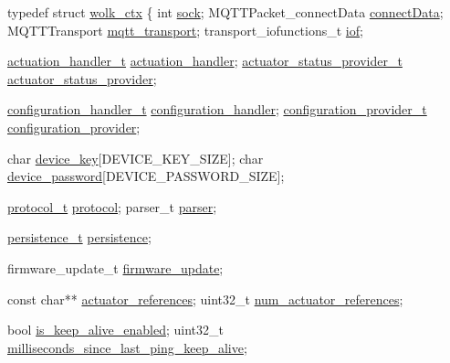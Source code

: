 \begin{DoxyCodeInclude}
\textcolor{keyword}{typedef} \textcolor{keyword}{struct }\hyperlink{structwolk__ctx}{wolk\_ctx} \{
    \textcolor{keywordtype}{int} \hyperlink{structwolk__ctx_a7b2318c99408cdafb7ede7f5d472e100}{sock};
    MQTTPacket\_connectData \hyperlink{structwolk__ctx_af63fca32333cbb2d7e2b887eff0b2461}{connectData};
    MQTTTransport \hyperlink{structwolk__ctx_a1f8d853e9ce94634dde14f0735207e5c}{mqtt\_transport};
    transport\_iofunctions\_t \hyperlink{structwolk__ctx_a4b934429cb22045256b5757901fe2d66}{iof};

    \hyperlink{wolk__connector_8h_acde87869e807b1774680f3f2b5b04e2f}{actuation\_handler\_t} \hyperlink{structwolk__ctx_a2ab241133283e361c6822409f7ec48ca}{actuation\_handler};
    \hyperlink{wolk__connector_8h_af3e8919a04a293972b64605557287537}{actuator\_status\_provider\_t} 
      \hyperlink{structwolk__ctx_aee7f3ef8dbcfd4f8a3817ef26a1629f6}{actuator\_status\_provider};

    \hyperlink{wolk__connector_8h_a6662d0d41546795466cc2b398d8dcb08}{configuration\_handler\_t} \hyperlink{structwolk__ctx_a6c0926345d1d56f8fbd3cb50d8f4a804}{configuration\_handler};
    \hyperlink{wolk__connector_8h_a64d56254d09f9e452751f32b3c5a39d3}{configuration\_provider\_t} \hyperlink{structwolk__ctx_a982fc36741a8c8cfb5ad3939363cebf8}{configuration\_provider};

    \textcolor{keywordtype}{char} \hyperlink{structwolk__ctx_a4b67ae9b0271566e7dae56c03053906b}{device\_key}[DEVICE\_KEY\_SIZE];
    \textcolor{keywordtype}{char} \hyperlink{structwolk__ctx_af6ea97768cfd0445f8b9535e0e2c354b}{device\_password}[DEVICE\_PASSWORD\_SIZE];

    \hyperlink{wolk__connector_8h_a91e19fa4fff461493e1a41f7c7aa4e5f}{protocol\_t} \hyperlink{structwolk__ctx_af93f257ff60dd00f34455d425207e66f}{protocol};
    parser\_t \hyperlink{structwolk__ctx_a823bd0528ef9d148f35d244becc4858a}{parser};

    \hyperlink{structpersistence__t}{persistence\_t} \hyperlink{structwolk__ctx_a9d7d83e339fcd632b0679db3f86b4293}{persistence};

    firmware\_update\_t \hyperlink{structwolk__ctx_ade7e18823de46d7973b729ba3cd52405}{firmware\_update};

    \textcolor{keyword}{const} \textcolor{keywordtype}{char}** \hyperlink{structwolk__ctx_aa2127e8414d0d9c6214343891f4a322f}{actuator\_references};
    uint32\_t \hyperlink{structwolk__ctx_a23e98a97649d679e4a85c87f2da1f8e5}{num\_actuator\_references};

    \textcolor{keywordtype}{bool} \hyperlink{structwolk__ctx_ab195921b22d85b2e46df09cca001f5e2}{is\_keep\_alive\_enabled};
    uint32\_t \hyperlink{structwolk__ctx_a2d93b135a08863cedae25012a6dc8d46}{milliseconds\_since\_last\_ping\_keep\_alive};


\end{DoxyCodeInclude}
